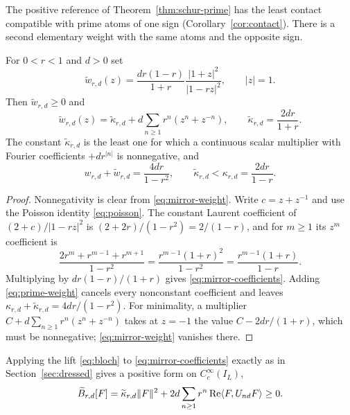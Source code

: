 The positive reference of Theorem~\ref{thm:schur-prime} has the least contact
compatible with prime atoms of one sign (Corollary~\ref{cor:contact}). There
is a second elementary weight with the same atoms and the opposite sign.

\begin{proposition}\label{prop:mirror}
For $0<r<1$ and $d>0$ set
\begin{equation}\label{eq:mirror-weight}
 \widetilde w_{r,d}(z)=\frac{dr(1-r)}{1+r}\frac{|1+z|^2}{|1-rz|^2},
 \qquad|z|=1 .
\end{equation}
Then $\widetilde w_{r,d}\geq0$ and
\begin{equation}\label{eq:mirror-coefficients}
 \widetilde w_{r,d}(z)
 =\widetilde\kappa_{r,d}+d\sum_{n\geq1}r^n(z^n+z^{-n}),
 \qquad
 \widetilde\kappa_{r,d}=\frac{2dr}{1+r} .
\end{equation}
The constant $\widetilde\kappa_{r,d}$ is the least one for which a continuous
scalar multiplier with Fourier coefficients $+dr^{|n|}$ is nonnegative, and
\begin{equation}\label{eq:complementary}
 w_{r,d}+\widetilde w_{r,d}=\frac{4dr}{1-r^2},
 \qquad
 \widetilde\kappa_{r,d}<\kappa_{r,d}=\frac{2dr}{1-r}.
\end{equation}
\end{proposition}
\begin{proof}
Nonnegativity is clear from \eqref{eq:mirror-weight}. Write $c=z+z^{-1}$ and
use the Poisson identity \eqref{eq:poisson}. The constant Laurent coefficient
of $(2+c)/|1-rz|^2$ is $(2+2r)/(1-r^2)=2/(1-r)$, and for $m\geq1$ its $z^m$
coefficient is
\[
 \frac{2r^m+r^{m-1}+r^{m+1}}{1-r^2}
 =\frac{r^{m-1}(1+r)^2}{1-r^2}
 =\frac{r^{m-1}(1+r)}{1-r}.
\]
Multiplying by $dr(1-r)/(1+r)$ gives \eqref{eq:mirror-coefficients}.
Adding \eqref{eq:prime-weight} cancels every nonconstant coefficient and
leaves $\kappa_{r,d}+\widetilde\kappa_{r,d}=4dr/(1-r^2)$. For minimality,
a multiplier $C+d\sum_{n\geq1}r^n(z^n+z^{-n})$ takes at $z=-1$ the value
$C-2dr/(1+r)$, which must be nonnegative; \eqref{eq:mirror-weight} vanishes
there.
\end{proof}

Applying the lift \eqref{eq:bloch} to \eqref{eq:mirror-coefficients} exactly
as in Section~\ref{sec:dressed} gives a positive form on $C_c^\infty(I_L)$,
\begin{equation}\label{eq:mirror-form}
 \widetilde B_{r,d}[F]
 =\widetilde\kappa_{r,d}\lVert F\rVert^2
  +2d\sum_{n\geq1}r^n\operatorname{Re}\langle F,U_{nd}F\rangle\geq0 .
\end{equation}

